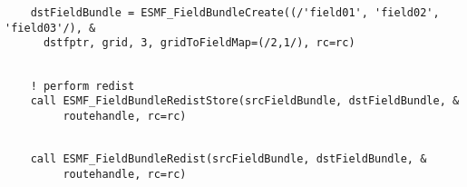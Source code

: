 
 \begin{verbatim}
    dstFieldBundle = ESMF_FieldBundleCreate((/'field01', 'field02', 'field03'/), &
      dstfptr, grid, 3, gridToFieldMap=(/2,1/), rc=rc)
 
\end{verbatim}
 

 \begin{verbatim}
    ! perform redist
    call ESMF_FieldBundleRedistStore(srcFieldBundle, dstFieldBundle, &
         routehandle, rc=rc)
 
\end{verbatim}
 

 \begin{verbatim}
    call ESMF_FieldBundleRedist(srcFieldBundle, dstFieldBundle, &
         routehandle, rc=rc)
 
\end{verbatim}

\setlength{\parskip}{\oldparskip}
\setlength{\parindent}{\oldparindent}
\setlength{\baselineskip}{\oldbaselineskip}
